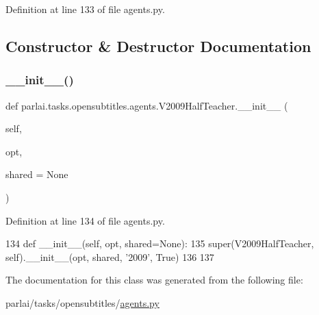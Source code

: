 Definition at line 133 of file agents.\+py.



\subsection{Constructor \& Destructor Documentation}
\mbox{\label{classparlai_1_1tasks_1_1opensubtitles_1_1agents_1_1V2009HalfTeacher_a9bc739825e9990d471efa003e92e52d4}} 
\subsubsection{\texorpdfstring{\+\_\+\+\_\+init\+\_\+\+\_\+()}{\_\_init\_\_()}}
{\footnotesize\ttfamily def parlai.\+tasks.\+opensubtitles.\+agents.\+V2009\+Half\+Teacher.\+\_\+\+\_\+init\+\_\+\+\_\+ (\begin{DoxyParamCaption}\item[{}]{self,  }\item[{}]{opt,  }\item[{}]{shared = {\ttfamily None} }\end{DoxyParamCaption})}



Definition at line 134 of file agents.\+py.


\begin{DoxyCode}
134     \textcolor{keyword}{def }\_\_init\_\_(self, opt, shared=None):
135         super(V2009HalfTeacher, self).\_\_init\_\_(opt, shared, \textcolor{stringliteral}{'2009'}, \textcolor{keyword}{True})
136 
137 
\end{DoxyCode}


The documentation for this class was generated from the following file\+:\begin{DoxyCompactItemize}
\item 
parlai/tasks/opensubtitles/\hyperlink{parlai_2tasks_2opensubtitles_2agents_8py}{agents.\+py}\end{DoxyCompactItemize}
